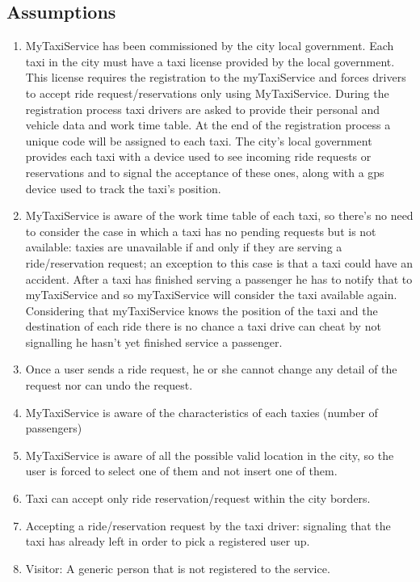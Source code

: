 \documentclass[11pt]{article} %
\begin{document}
    \subsection{Assumptions}
    \begin{enumerate}
        \item MyTaxiService has been commissioned by the city local government.
        Each taxi in the city must have a taxi license provided by the local government. This license requires the registration to the myTaxiService
        and forces drivers to accept ride request/reservations only using MyTaxiService.
        During the registration process taxi drivers are asked to provide their personal and vehicle data and work time table.
        At the end of the registration process a unique code will be assigned to each taxi.
        The city's local government provides each taxi with a device used to see incoming ride requests or reservations and
        to signal the acceptance of these ones, along with a gps device used to track the taxi's position.

        \item MyTaxiService is aware of the work time table of each taxi, so there's no need to consider
        the case in which a taxi has no pending requests but is not available: taxies are unavailable
        if and only if they are serving a ride/reservation request; an exception to this case is that a taxi could have an accident.  After a taxi has finished serving a passenger he has to notify that
        to myTaxiService and so myTaxiService will consider the taxi available again. Considering that myTaxiService knows the position
        of the taxi and the destination of each ride there is no chance a taxi drive can cheat by not signalling he hasn't yet finished service a passenger.

        \item Once a user sends a ride request, he or she cannot change any detail of the request nor can
          undo the request.

        \item MyTaxiService is aware of the characteristics of each taxies (number of passengers)

        \item MyTaxiService is aware of all the possible valid location in the city, so the user is forced to select one of them and not insert one of them.

        \item Taxi can accept only ride reservation/request within the city borders.

        \item Accepting a ride/reservation request by the taxi driver: signaling that the taxi has already left in order to pick a registered user up.

        \item Visitor: A generic person that is not registered to the service.
    \end{enumerate}
\end{document}
